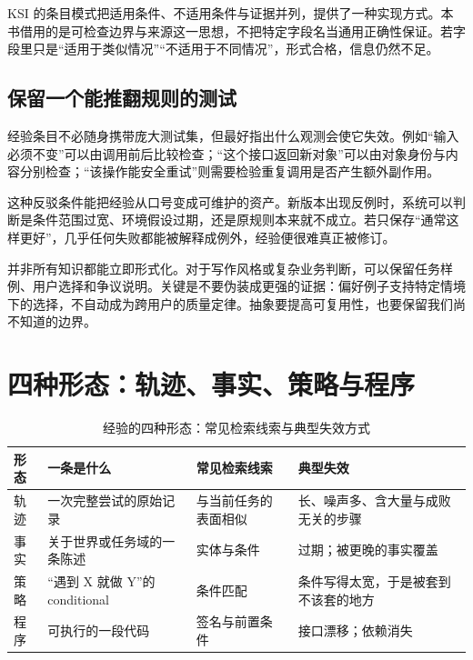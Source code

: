 KSI 的条目模式把适用条件、不适用条件与证据并列\cite{ksi-2607}，提供了一种实现方式。本书借用的是可检查边界与来源这一思想，不把特定字段名当通用正确性保证。若字段里只是“适用于类似情况”“不适用于不同情况”，形式合格，信息仍然不足。

\subsection{保留一个能推翻规则的测试}

经验条目不必随身携带庞大测试集，但最好指出什么观测会使它失效。例如“输入必须不变”可以由调用前后比较检查；“这个接口返回新对象”可以由对象身份与内容分别检查；“该操作能安全重试”则需要检验重复调用是否产生额外副作用。

这种反驳条件能把经验从口号变成可维护的资产。新版本出现反例时，系统可以判断是条件范围过宽、环境假设过期，还是原规则本来就不成立。若只保存“通常这样更好”，几乎任何失败都能被解释成例外，经验便很难真正被修订。

并非所有知识都能立即形式化。对于写作风格或复杂业务判断，可以保留任务样例、用户选择和争议说明。关键是不要伪装成更强的证据：偏好例子支持特定情境下的选择，不自动成为跨用户的质量定律。抽象要提高可复用性，也要保留我们尚不知道的边界。


\section{四种形态：轨迹、事实、策略与程序}
\label{sec:ch05-forms}

\begin{table}[htbp]
\centering
\caption{经验的四种形态：常见检索线索与典型失效方式}
\label{tab:ch05-forms}
\begin{tabular}{>{\raggedright\arraybackslash}p{2.2cm}>{\raggedright\arraybackslash}p{4.0cm}>{\raggedright\arraybackslash}p{3.6cm}>{\raggedright\arraybackslash}p{3.3cm}}
\toprule
形态 & 一条是什么 & 常见检索线索 & 典型失效 \\
\midrule
轨迹 & 一次完整尝试的原始记录 & 与当前任务的表面相似 & 长、噪声多、含大量与成败无关的步骤 \\
事实 & 关于世界或任务域的一条陈述 & 实体与条件 & 过期；被更晚的事实覆盖 \\
策略 & ``遇到 X 就做 Y''的 conditional & 条件匹配 & 条件写得太宽，于是被套到不该套的地方 \\
程序 & 可执行的一段代码 & 签名与前置条件 & 接口漂移；依赖消失 \\
\bottomrule
\end{tabular}
\end{table}

